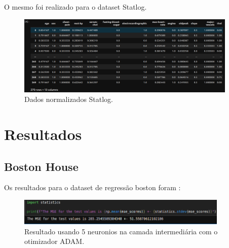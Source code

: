 \documentclass{article}
\begin{document}
\vspace{10pt}

O mesmo foi realizado para o dataset Statlog.

\vspace{10pt}

\begin{figure}[h]

    \centering
    \includegraphics[height=1.5in]{normalized_data_statlog.png}
    \caption{Dados normalizados Statlog.}
    \label{fig:example}
    
\end{figure}

\vspace{10pt}



\vspace{10pt}

\section{Resultados}

\vspace{10pt}

\subsection{Boston House}

\vspace{10pt}

Os resultados para o dataset de regressão boston foram : 

\vspace{10pt}

\begin{figure}[h]

    \centering
    \includegraphics[height=0.5in]{reg_5n.png}
    \caption{Resultado usando 5 neuronios na camada intermediária com o otimizador ADAM.}
    \label{fig:example}
    
\end{figure}
\end{document}
